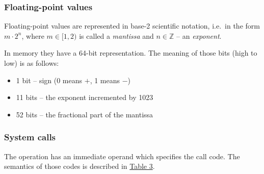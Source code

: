\hypertarget{float:storage}{}

\subsubsection{Floating-point values}

Floating-point values are represented in base-2 scientific notation, i.e.\ in the form $m\cdot 2^n$, \newline
where $m\in [1, 2)$ is called a \textit{mantissa} and $n\in \mathbb{Z}$ -- an \textit{exponent}.

In memory they have a 64-bit representation.
The meaning of those bits (high to low) is as follows:

\begin{itemize}
    \item 1 bit -- sign (0 means $+$, 1 means $-$)
    \item 11 bits -- the exponent incremented by 1023
    \item 52 bits -- the fractional part of the mantissa
\end{itemize}

\hypertarget{syscall:details}{}

\subsubsection{System calls}

The \hyperlink{syscall}{} operation has an immediate operand which specifies the call code.
The semantics of those codes is described in \hyperlink{syscall:codes}{Table 3}.

